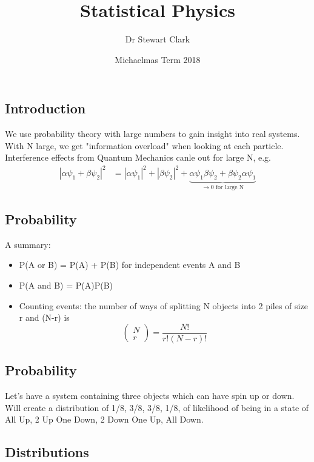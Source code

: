 \documentclass[a4paper, 11pt, normalem]{report}
\title{Statistical Physics \vspace{-20pt}}
\author{Dr Stewart Clark}
\date{\vspace{-15pt}Michaelmas Term 2018}
\begin{document}
\maketitle
\tableofcontents

\chapter{}
\section{Introduction}
We use probability theory with large numbers to gain insight into real systems.
With N large, we get "information overload" when looking at each particle.
Interference effects from Quantum Mechanics canle out for large N, e.g.
\begin{align}
    |\alpha\psi_1 + \beta\psi_2|^2 &= |\alpha\psi_1|^2 + |\beta\psi_2|^2 + \underbrace{\alpha\psi_1\beta\psi_2 + \beta\psi_2\alpha\psi_1}_{\to 0 \text{ for large N}}
\end{align}

\section{Probability}
A summary:
\begin{itemize}
    \item P(A or B) = P(A) + P(B) for independent events A and B    
    \item P(A and B) = P(A)P(B)
    \item Counting events: the number of ways of splitting N objects into 2 piles of size r and (N-r) is
        \begin{equation}
            \begin{pmatrix} N \\ r \end{pmatrix} = \frac{N!}{r!(N-r)!}
        \end{equation}
\end{itemize}

\section{Probability}
Let's have a system containing three objects which can have spin up or down. 
Will create a distribution of 1/8, 3/8, 3/8, 1/8, of likelihood of being in a state of All Up, 2 Up One Down, 2 Down One Up, All Down. 

\section{Distributions}
\end{document}
